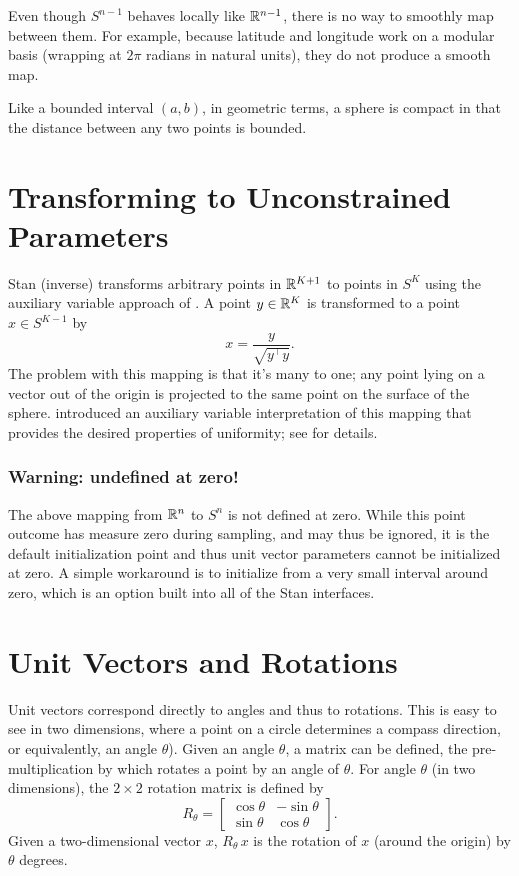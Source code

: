 Even though $S^{n-1}$ behaves locally like $\mathbb{R}^{n-1}$, there is no
way to smoothly map between them. For example, because
latitude and longitude work on a modular basis (wrapping at $2\pi$
radians in natural units), they do not produce a smooth map.

Like a bounded interval $(a, b)$, in geometric terms, a sphere is
compact in that the distance between any two points is bounded.


\section{Transforming to Unconstrained Parameters}

Stan (inverse) transforms arbitrary points in $\mathbb{R}^{K+1}$ to points
in $S^K$ using the auxiliary variable approach of
\cite{Marsaglia:1972}.  A point $y \in \mathbb{R}^K$ is transformed to a
point $x \in S^{K-1}$ by
%
\[
x = \frac{y}{\sqrt{y^{\top} y}}.
\]
%
The problem with this mapping is that it's many to one; any point
lying on a vector out of the origin is projected to the same point on
the surface of the sphere.  \cite{Marsaglia:1972} introduced an
auxiliary variable interpretation of this mapping that provides the
desired properties of uniformity; see  for
details.


\subsubsection{Warning: undefined at zero!}

The above mapping from $\mathbb{R}^n$ to $S^n$ is not defined at zero.
While this point outcome has measure zero during sampling, and may
thus be ignored, it is the default initialization point and thus unit
vector parameters cannot be initialized at zero.  A simple workaround
is to initialize from a very small interval around zero, which is an
option built into all of the Stan interfaces.



\section{Unit Vectors and Rotations}

Unit vectors correspond directly to angles and thus to rotations.
This is easy to see in two dimensions, where a point on a circle
determines a compass direction, or equivalently, an angle $\theta$).
Given an angle $\theta$, a matrix can be defined, the
pre-multiplication by which rotates a point by an angle of $\theta$.
For angle $\theta$ (in two dimensions), the $2 \times 2$ rotation
matrix is defined by
\[
R_{\theta}
=
\begin{bmatrix}
\cos \theta & - \sin \theta
\\
\sin \theta & \cos \theta
\end{bmatrix}.
\]
Given a two-dimensional vector $x$, $R_{\theta} \, x$ is the rotation
of $x$ (around the origin) by $\theta$ degrees.

